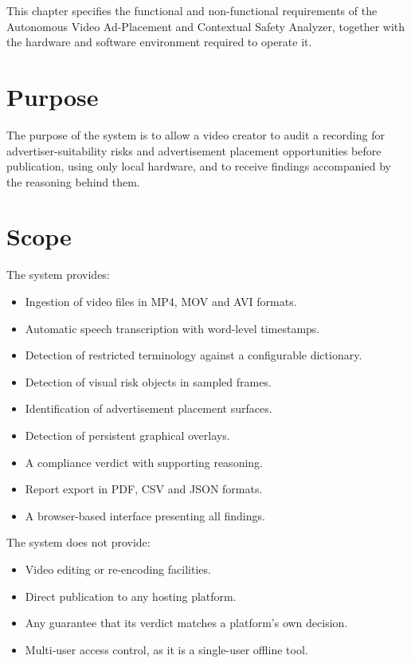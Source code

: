 \documentclass[12pt,a4paper,twoside]{report}
\begin{document}
This chapter specifies the functional and non-functional requirements of the Autonomous Video Ad-Placement and Contextual Safety Analyzer, together with the hardware and software environment required to operate it.

\section{Purpose}

The purpose of the system is to allow a video creator to audit a recording for advertiser-suitability risks and advertisement placement opportunities before publication, using only local hardware, and to receive findings accompanied by the reasoning behind them.

\section{Scope}

The system provides:

\begin{itemize}
\item Ingestion of video files in MP4, MOV and AVI formats.
\item Automatic speech transcription with word-level timestamps.
\item Detection of restricted terminology against a configurable dictionary.
\item Detection of visual risk objects in sampled frames.
\item Identification of advertisement placement surfaces.
\item Detection of persistent graphical overlays.
\item A compliance verdict with supporting reasoning.
\item Report export in PDF, CSV and JSON formats.
\item A browser-based interface presenting all findings.
\end{itemize}

The system does not provide:

\begin{itemize}
\item Video editing or re-encoding facilities.
\item Direct publication to any hosting platform.
\item Any guarantee that its verdict matches a platform's own decision.
\item Multi-user access control, as it is a single-user offline tool.
\end{itemize}
\end{document}
